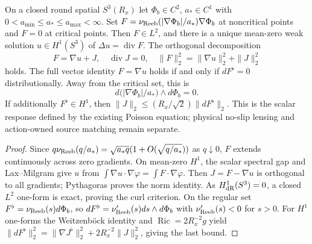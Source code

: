 \documentclass[12pt,a4paper]{article}
\begin{document}
\begin{proposition}
\label{p8:prop:v382-reeb-hodge-lensing-projection}
On a closed round spatial $S^3(R_x)$ let $\Phi_b\in C^2$,
$a_*\in C^1$ with $0<a_{\min}\le a_*\le a_{\max}<\infty$.
Set $F=\nu_{\rm Reeb}(|\nabla\Phi_b|/a_*)\nabla\Phi_b$ at
noncritical points and $F=0$ at critical points. Then $F\in L^2$,
and there is a unique mean-zero weak solution
$u\in H^1(S^3)$ of $\Delta u=\operatorname{div}F$.
The orthogonal decomposition
\[
 \boxed{F=\nabla u+J,\quad\operatorname{div}J=0,\quad
 \|F\|_2^2=\|\nabla u\|_2^2+\|J\|_2^2}
\]
holds. The full vector identity $F=\nabla u$ holds if and only if
$dF^\flat=0$ distributionally. Away from the critical set, this is
\[
 d\bigl(|\nabla\Phi_b|/a_*\bigr)\wedge d\Phi_b=0.
\]
If additionally $F^\flat\in H^1$, then
$\|J\|_2\le (R_x/\sqrt2)\|dF^\flat\|_2$.
This is the scalar response defined by the existing Poisson equation;
physical no-slip lensing and action-owned source matching remain separate.
\end{proposition}
\begin{proof}
Since $q\nu_{\rm Reeb}(q/a_*)=\sqrt{a_*q}(1+O(\sqrt{q/a_*}))$
as $q\downarrow0$, $F$ extends continuously across zero gradients.
On mean-zero $H^1$, the scalar spectral gap and Lax--Milgram give $u$
from $\int\nabla u\cdot\nabla\varphi=\int F\cdot\nabla\varphi$.
Then $J=F-\nabla u$ is orthogonal to all gradients; Pythagoras
proves the norm identity. As $H^1_{\rm dR}(S^3)=0$, a closed $L^2$
one-form is exact, proving the curl criterion. On the regular set
$F^\flat=\nu_{\rm Reeb}(s)d\Phi_b$, so
$dF^\flat=\nu'_{\rm Reeb}(s)ds\wedge d\Phi_b$ with
$\nu'_{\rm Reeb}(s)<0$ for $s>0$.
For $H^1$ one-forms the Weitzenb\"ock identity and
$\operatorname{Ric}=2R_x^{-2}g$ yield
$\|dF^\flat\|_2^2=\|\nabla J^\flat\|_2^2+
2R_x^{-2}\|J\|_2^2$, giving the last bound.
\end{proof}
\end{document}
